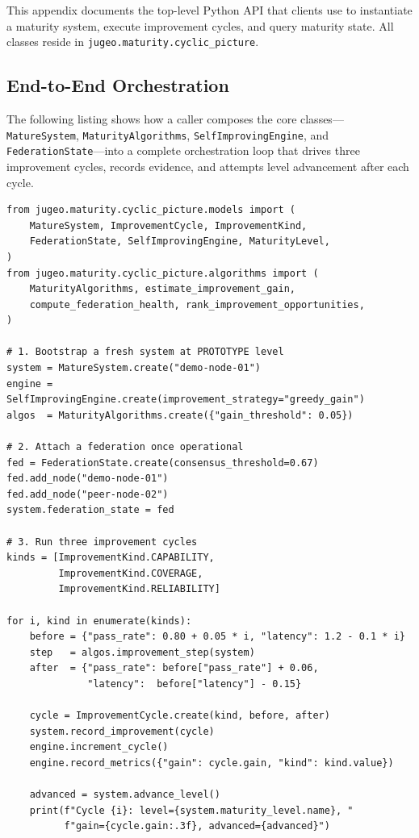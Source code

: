 \documentclass[11pt]{article}
\begin{document}
This appendix documents the top-level Python API that clients use to
instantiate a maturity system, execute improvement cycles, and query
maturity state.  All classes reside in
\texttt{jugeo.maturity.cyclic\_picture}.

\subsection{End-to-End Orchestration}

The following listing shows how a caller composes the core classes—\texttt{MatureSystem},
\texttt{MaturityAlgorithms}, \texttt{SelfImprovingEngine}, and
\texttt{FederationState}—into a complete orchestration loop that drives
three improvement cycles, records evidence, and attempts level advancement
after each cycle.

\begin{lstlisting}[style=jugeo-python,
  caption={End-to-end orchestration of three improvement cycles.}]
from jugeo.maturity.cyclic_picture.models import (
    MatureSystem, ImprovementCycle, ImprovementKind,
    FederationState, SelfImprovingEngine, MaturityLevel,
)
from jugeo.maturity.cyclic_picture.algorithms import (
    MaturityAlgorithms, estimate_improvement_gain,
    compute_federation_health, rank_improvement_opportunities,
)

# 1. Bootstrap a fresh system at PROTOTYPE level
system = MatureSystem.create("demo-node-01")
engine = SelfImprovingEngine.create(improvement_strategy="greedy_gain")
algos  = MaturityAlgorithms.create({"gain_threshold": 0.05})

# 2. Attach a federation once operational
fed = FederationState.create(consensus_threshold=0.67)
fed.add_node("demo-node-01")
fed.add_node("peer-node-02")
system.federation_state = fed

# 3. Run three improvement cycles
kinds = [ImprovementKind.CAPABILITY,
         ImprovementKind.COVERAGE,
         ImprovementKind.RELIABILITY]

for i, kind in enumerate(kinds):
    before = {"pass_rate": 0.80 + 0.05 * i, "latency": 1.2 - 0.1 * i}
    step   = algos.improvement_step(system)
    after  = {"pass_rate": before["pass_rate"] + 0.06,
              "latency":  before["latency"] - 0.15}

    cycle = ImprovementCycle.create(kind, before, after)
    system.record_improvement(cycle)
    engine.increment_cycle()
    engine.record_metrics({"gain": cycle.gain, "kind": kind.value})

    advanced = system.advance_level()
    print(f"Cycle {i}: level={system.maturity_level.name}, "
          f"gain={cycle.gain:.3f}, advanced={advanced}")
\end{lstlisting}
\end{document}
